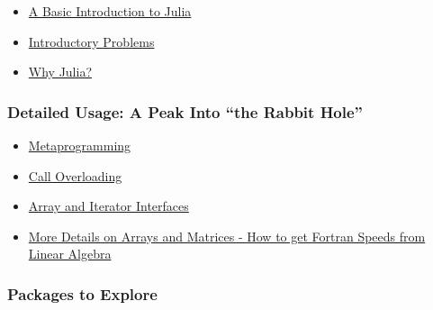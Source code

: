 \documentclass[11pt]{article}
\begin{document}
\begin{itemize}
\itemsep1pt\parskip0pt
\item
  \href{http://ucidatascienceinitiative.github.io/IntroToJulia/Slides/BasicIntroduction}{A
  Basic Introduction to Julia}
\item
  \href{http://ucidatascienceinitiative.github.io/IntroToJulia/Slides/BasicProblems}{Introductory
  Problems}
\item
  \href{http://ucidatascienceinitiative.github.io/IntroToJulia/Slides/WhyJulia}{Why
  Julia?}
\end{itemize}

\subsubsection{Detailed Usage: A Peak Into ``the Rabbit
Hole''}\label{detailed-usage-a-peak-into-the-rabbit-hole}

\begin{itemize}
\itemsep1pt\parskip0pt
\item
  \href{http://ucidatascienceinitiative.github.io/IntroToJulia/Slides/Metaprogramming}{Metaprogramming}
\item
  \href{http://ucidatascienceinitiative.github.io/IntroToJulia/Slides/CallOverloading}{Call
  Overloading}
\item
  \href{http://ucidatascienceinitiative.github.io/IntroToJulia/Slides/ArrayIteratorInterfaces}{Array
  and Iterator Interfaces}
\item
  \href{http://ucidatascienceinitiative.github.io/IntroToJulia/Slides/ArraysAndMatrices}{More
  Details on Arrays and Matrices - How to get Fortran Speeds from Linear
  Algebra}
\end{itemize}

\subsubsection{Packages to Explore}\label{packages-to-explore}
\end{document}
